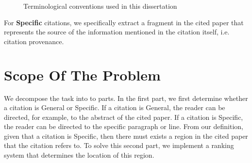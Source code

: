 \begin{figure}[h]
\label{fig:terminology}
\caption{Terminological conventions used in this dissertation}
\end{figure}

For \textbf{Specific} citations, we specifically extract a fragment in the cited paper that represents the source of the information mentioned in the citation itself, i.e. citation provenance.

\section{Scope Of The Problem}
We decompose the task into to parts.  In the first part, we first determine whether a citation is General or Specific. If a citation is General, the reader can be directed, for example, to the abstract of the cited paper. If a citation is Specific, the reader can be directed to the specific paragraph or line.  From our definition, given that a citation is Specific, then there must exists a region in the cited paper that the citation refers to. To solve this second part, we implement a ranking system that determines the location of this region.

